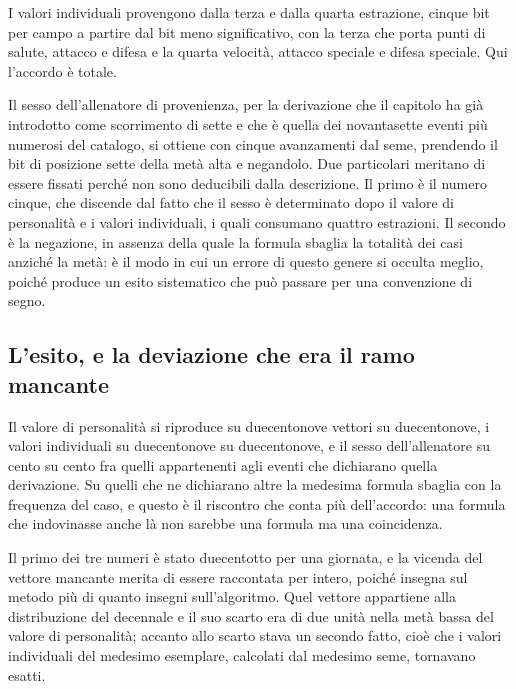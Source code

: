 I valori individuali provengono dalla terza e dalla quarta estrazione, cinque bit per campo a partire dal bit meno significativo, con la terza che porta punti di salute, attacco e difesa e la quarta velocità, attacco speciale e difesa speciale. Qui l'accordo è totale.

Il sesso dell'allenatore di provenienza, per la derivazione che il capitolo ha già introdotto come scorrimento di sette e che è quella dei novantasette eventi più numerosi del catalogo, si ottiene con cinque avanzamenti dal seme, prendendo il bit di posizione sette della metà alta e negandolo. Due particolari meritano di essere fissati perché non sono deducibili dalla descrizione. Il primo è il numero cinque, che discende dal fatto che il sesso è determinato dopo il valore di personalità e i valori individuali, i quali consumano quattro estrazioni. Il secondo è la negazione, in assenza della quale la formula sbaglia la totalità dei casi anziché la metà: è il modo in cui un errore di questo genere si occulta meglio, poiché produce un esito sistematico che può passare per una convenzione di segno.

\subsection*{L'esito, e la deviazione che era il ramo mancante}

Il valore di personalità si riproduce su duecentonove vettori su duecentonove, i valori individuali su duecentonove su duecentonove, e il sesso dell'allenatore su cento su cento fra quelli appartenenti agli eventi che dichiarano quella derivazione. Su quelli che ne dichiarano altre la medesima formula sbaglia con la frequenza del caso, e questo è il riscontro che conta più dell'accordo: una formula che indovinasse anche là non sarebbe una formula ma una coincidenza.

Il primo dei tre numeri è stato duecentotto per una giornata, e la vicenda del vettore mancante merita di essere raccontata per intero, poiché insegna sul metodo più di quanto insegni sull'algoritmo. Quel vettore appartiene alla distribuzione del decennale e il suo scarto era di due unità nella metà bassa del valore di personalità; accanto allo scarto stava un secondo fatto, cioè che i valori individuali del medesimo esemplare, calcolati dal medesimo seme, tornavano esatti.

